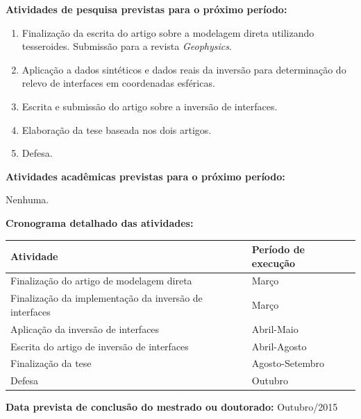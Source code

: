 \documentclass[12pt,a4paper]{article}
\begin{document}
\begin{flushleft}

\textbf{Atividades de pesquisa previstas para o próximo período:}

\begin{enumerate}
    \item Finalização da escrita do artigo sobre a modelagem direta utilizando
        tesseroides. Submissão para a revista \textit{Geophysics}.
    \item Aplicação a dados sintéticos e dados reais da inversão para
        determinação do relevo de interfaces em coordenadas esféricas.
    \item Escrita e submissão do artigo sobre a inversão de interfaces.
    \item Elaboração da tese baseada nos dois artigos.
    \item Defesa.
\end{enumerate}

\textbf{Atividades acadêmicas previstas para o próximo período:}

\bigskip

Nenhuma.

\bigskip

\textbf{Cronograma detalhado das atividades:}

\begin{center}
\begin{tabular}{l|l}
    \toprule
    \textbf{Atividade} & \textbf{Período de execução} \\
    \midrule
    Finalização do artigo de modelagem direta & Março\\
    Finalização da implementação da inversão de interfaces & Março\\
    Aplicação da inversão de interfaces & Abril-Maio\\
    Escrita do artigo de inversão de interfaces & Abril-Agosto\\
    Finalização da tese & Agosto-Setembro\\
    Defesa & Outubro\\
    \bottomrule
\end{tabular}
\end{center}


\bigskip

\textbf{Data prevista de conclusão do mestrado ou doutorado:} Outubro/2015

\end{flushleft}
\end{document}
